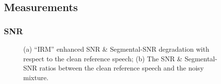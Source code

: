 \subsection{Measurements}
\subsubsection{SNR}
\begin{figure}[H]
    \centering
    \caption{(a) ``IRM'' enhanced SNR \& Segmental-SNR degradation
        with respect to the clean reference speech;\;\;
        (b) The SNR \& Segmental-SNR ratios between the
        clean reference speech and the noisy mixture.}\label{fig:irm_enh_noisy_snr} 
\end{figure}

